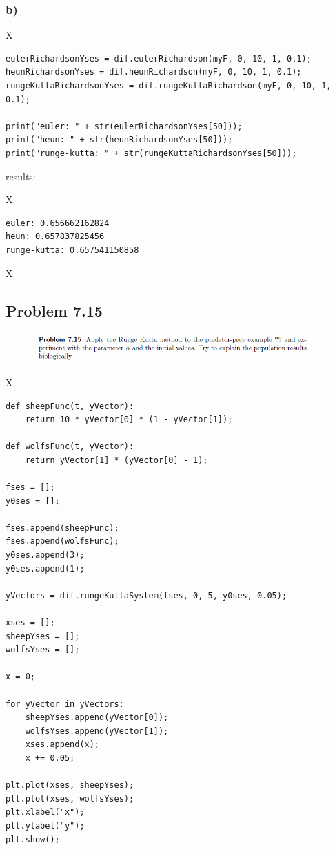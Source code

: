 \subsubsection{b)}

X

\begin{lstlisting}[caption=todo]
eulerRichardsonYses = dif.eulerRichardson(myF, 0, 10, 1, 0.1);
heunRichardsonYses = dif.heunRichardson(myF, 0, 10, 1, 0.1);
rungeKuttaRichardsonYses = dif.rungeKuttaRichardson(myF, 0, 10, 1, 0.1);

print("euler: " + str(eulerRichardsonYses[50]));
print("heun: " + str(heunRichardsonYses[50]));
print("runge-kutta: " + str(rungeKuttaRichardsonYses[50]));
\end{lstlisting}


results:

X

\begin{lstlisting}[caption=Result of 1.1 a), keywordstyle=\color{black}]
euler: 0.656662162824
heun: 0.657837825456
runge-kutta: 0.657541150858
\end{lstlisting}

X









\subsection{Problem 7.15}


\begin{figure}[!ht]
\includegraphics[width=1\textwidth]{chapters/images/desc-7-15}
\end{figure}



X

\begin{lstlisting}[caption=todo]
def sheepFunc(t, yVector):
	return 10 * yVector[0] * (1 - yVector[1]);

def wolfsFunc(t, yVector):
	return yVector[1] * (yVector[0] - 1);

fses = [];
y0ses = [];

fses.append(sheepFunc);
fses.append(wolfsFunc);
y0ses.append(3);
y0ses.append(1);

yVectors = dif.rungeKuttaSystem(fses, 0, 5, y0ses, 0.05);

xses = [];
sheepYses = [];
wolfsYses = [];

x = 0;

for yVector in yVectors:
	sheepYses.append(yVector[0]);
	wolfsYses.append(yVector[1]);
	xses.append(x);
	x += 0.05;

plt.plot(xses, sheepYses);
plt.plot(xses, wolfsYses);
plt.xlabel("x");
plt.ylabel("y");
plt.show();
\end{lstlisting}


